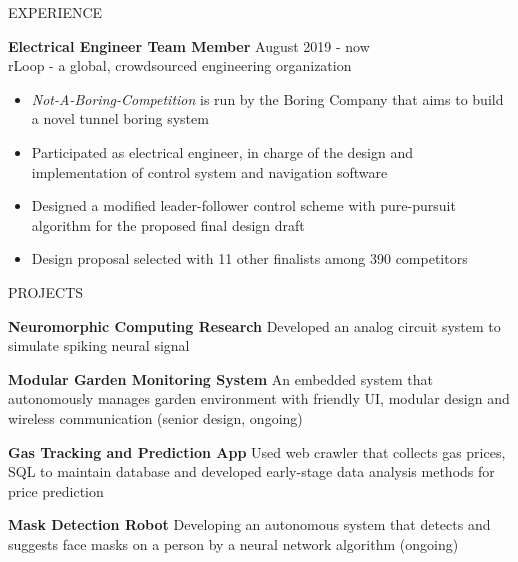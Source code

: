 \documentclass{resume} %
\begin{document}
\begin{rSection}{EXPERIENCE}
		
		\textbf{Electrical Engineer Team Member} \hfill August 2019 - now
		\\	rLoop - a global, crowdsourced engineering organization \hfill \textit{}
		\begin{itemize}
			\itemsep -4pt {} 
			\item \textit{Not-A-Boring-Competition} is run by the Boring Company that aims to build a novel tunnel boring system
			\item Participated as electrical engineer, in charge of the design and implementation of control system and navigation software
			\item Designed a modified leader-follower control scheme with pure-pursuit algorithm for the proposed final design draft
			\item Design proposal selected with 11 other finalists among 390 competitors
		\end{itemize}
		
			
		
	\end{rSection} 
	
	
	\begin{rSection}{PROJECTS}
		\vspace{-1em}
		
		\item \textbf{Neuromorphic Computing Research} {Developed an analog circuit system to simulate spiking neural signal}
		
		\item \textbf{Modular Garden Monitoring System} {An embedded system that autonomously manages garden environment with friendly UI, modular design and wireless communication (senior design, ongoing)}
		
		\item \textbf{Gas Tracking and Prediction App} {Used web crawler that collects gas prices, SQL to maintain database and developed early-stage data analysis methods for price prediction}
		
		\item \textbf{Mask Detection Robot} {Developing an autonomous system that detects and suggests face masks on a person by a neural network algorithm (ongoing)}
		
		
	\end{rSection} 
	
\end{document}
